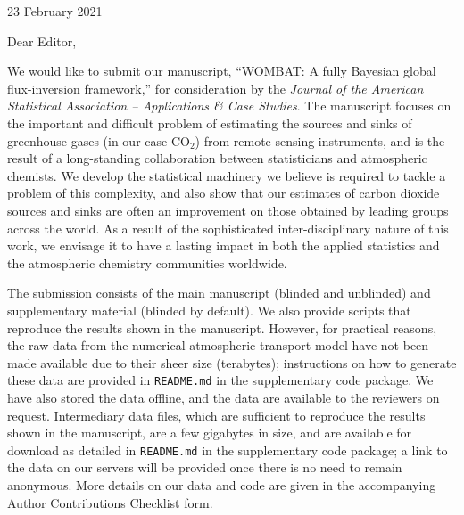 \documentclass[english]{letter}
\begin{document}
\thispagestyle{empty}
23 February 2021

\vspace{0.5in}

Dear Editor,

\vspace{0.5cm}


We would like to submit our manuscript, ``WOMBAT: A fully Bayesian global flux-inversion framework,'' for consideration by the \emph{Journal of the American Statistical Association -- Applications \& Case Studies}. The manuscript focuses on the important and difficult problem of estimating the sources and sinks of greenhouse gases (in our case CO$_2$) from remote-sensing instruments, and is the result of a long-standing collaboration between statisticians and atmospheric chemists. We develop the statistical machinery we believe is required to tackle a problem of this complexity, and also show that our estimates of carbon dioxide sources and sinks are often an improvement on those obtained by leading groups across the world.  As a result of the sophisticated inter-disciplinary nature of this work, we envisage it to have a lasting impact in both the applied statistics and the atmospheric chemistry communities worldwide.

The submission consists of the main manuscript (blinded and unblinded) and supplementary material (blinded by default). We also provide scripts that reproduce the results shown in the manuscript. However, for practical reasons, the raw data from the numerical atmospheric transport model have not been made available due to their sheer size (terabytes); instructions on how to generate these data are provided in  \texttt{README.md} in the supplementary code package. We have also stored the data offline, and the data are available to the reviewers on request. Intermediary data files, which are sufficient to reproduce the results shown in the manuscript, are a few gigabytes in size, and are available for download as detailed in \texttt{README.md} in the supplementary code package; a link to the data on our servers will be provided once there is no need to remain anonymous. More details on our data and code are given in the accompanying Author Contributions Checklist form.

\end{document}
